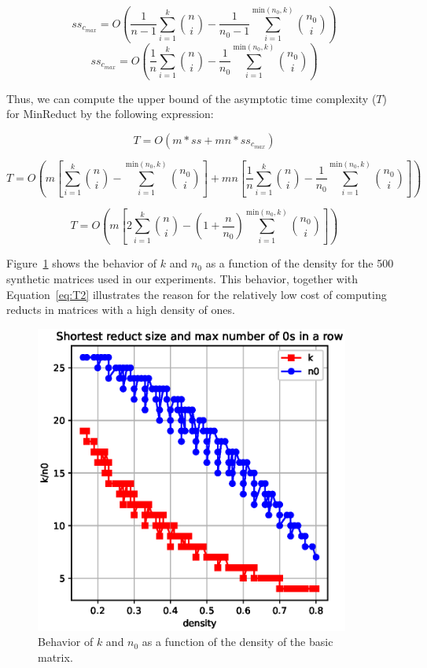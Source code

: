 \documentclass[citenumber]{llncs}
\begin{document}
	\begin{equation*}
	ss_{c_{max}}= O\left(\frac{1}{n-1}\sum_{i=1}^{k} \binom{n}{i} - \frac{1}{n_0-1}\sum_{i=1}^{\mathrm{min}(n_0,k)} \binom{n_0}{i}\right)\label{eq:c_max1}
	\end{equation*}
	\begin{equation}
	ss_{c_{max}}= O\left(\frac{1}{n}\sum_{i=1}^{k} \binom{n}{i} - \frac{1}{n_0}\sum_{i=1}^{\mathrm{min}(n_0,k)} \binom{n_0}{i}\right)\label{eq:c_max2}
	\end{equation}
	
	Thus, we can compute the upper bound of the asymptotic time complexity ($T$) for MinReduct by the following expression:
	
	\begin{equation}
	T = O\left(m*ss + mn*ss_{c_{max}}\label{eq:T1}\right)
	\end{equation}
	
	\begin{equation*}
	T = O\left(m\left[\sum_{i=1}^{k} \binom{n}{i} - \sum_{i=1}^{\mathrm{min}(n_0,k)} \binom{n_0}{i}\right]+mn\left[\frac{1}{n}\sum_{i=1}^{k} \binom{n}{i} - \frac{1}{n_0}\sum_{i=1}^{\mathrm{min}(n_0,k)} \binom{n_0}{i}\right]\right)
	\end{equation*}	
	
	\begin{equation}
	T = O\left(m\left[2\sum_{i=1}^{k} \binom{n}{i} - \left(1 + \frac{n}{n_0}\right)\sum_{i=1}^{\mathrm{min}(n_0,k)} \binom{n_0}{i}\right]\right)\label{eq:T2}
	\end{equation}	
	
	Figure~\ref{fig:n0} shows the behavior of  $k$ and $n_0$ as a function of the density for the 500 synthetic matrices used in our experiments. This behavior, together with Equation~\ref{eq:T2} illustrates the reason for the relatively low cost of computing reducts in matrices with a high density of ones.
		
	\begin{figure}[hbt]
		\begin{center}
			\includegraphics[height=4in]{Length_and_N0_vs_denisty.eps} 
		\end{center}
		\caption{Behavior of $k$ and $n_0$ as a function of the density of the basic matrix.}\label{fig:n0}
	\end{figure}  
	
\end{document}
